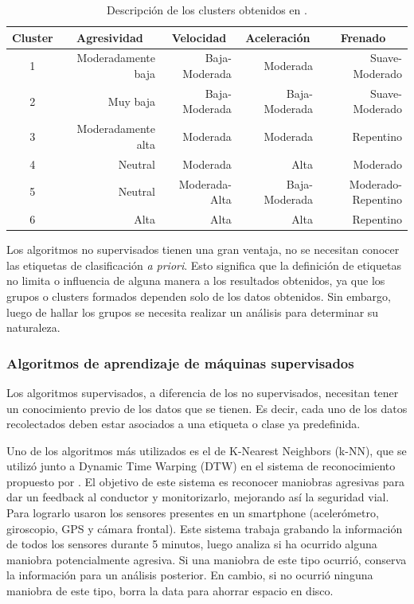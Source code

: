 \begin{table}[htbp!]
\centering
\begin{tabular}{crrrr}
\toprule
\multicolumn{1}{l}{\textbf{Cluster}} & \multicolumn{1}{c}{\textbf{Agresividad}} & \multicolumn{1}{c}{\textbf{Velocidad}} & \multicolumn{1}{c}{\textbf{Aceleración}} & \multicolumn{1}{c}{\textbf{Frenado}} \\ \midrule
1 & Moderadamente baja & Baja-Moderada & Moderada & Suave-Moderado \\
2 & Muy baja & Baja-Moderada & Baja-Moderada & Suave-Moderado \\
3 & Moderadamente alta & Moderada & Moderada & Repentino \\
4 & Neutral & Moderada & Alta & Moderado \\
5 & Neutral & Moderada-Alta & Baja-Moderada & Moderado-Repentino \\
6 & Alta & Alta & Alta & Repentino \\ \bottomrule
\end{tabular}
\caption[Descripción de los clusters obtenidos]{Descripción de los clusters obtenidos en \cite{constantinescu}.}
\label{diag:2.1}
\end{table}

Los algoritmos no supervisados tienen una gran ventaja, no se necesitan conocer las etiquetas de clasificación {\it a priori}. Esto significa que la definición de etiquetas no limita o influencia de alguna manera a los resultados obtenidos, ya que los grupos o clusters formados dependen solo de los datos obtenidos. Sin embargo, luego de hallar los grupos se necesita realizar un análisis para determinar su naturaleza.

\subsubsection{Algoritmos de aprendizaje de máquinas supervisados}

Los algoritmos supervisados, a diferencia de los no supervisados, necesitan tener un conocimiento previo de los datos que se tienen. Es decir, cada uno de los datos recolectados deben estar asociados a una etiqueta o clase ya predefinida.

Uno de los algoritmos más utilizados es el de K-Nearest Neighbors (k-NN), que se utilizó junto a Dynamic Time Warping (DTW) en el sistema de reconocimiento propuesto por \citeauthor{6083078} \cite{6083078}. El objetivo de este sistema es reconocer maniobras agresivas para dar un feedback al conductor y monitorizarlo, mejorando así la seguridad vial. Para lograrlo usaron los sensores presentes en un smartphone (acelerómetro, giroscopio, GPS y cámara frontal). Este sistema trabaja grabando la información de todos los sensores durante 5 minutos, luego analiza si ha ocurrido alguna maniobra potencialmente agresiva. Si una maniobra de este tipo ocurrió, conserva la información para un análisis posterior. En cambio, si no ocurrió ninguna maniobra de este tipo, borra la data para ahorrar espacio en disco.

